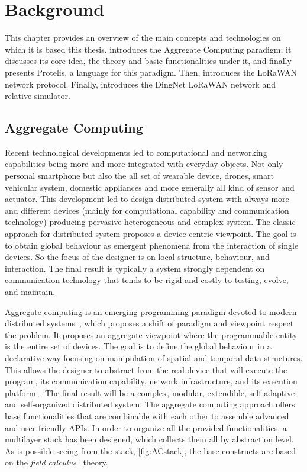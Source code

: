 \chapter{Background}
\label{chap:background}
This chapter provides an overview of the main concepts and technologies on which it is based this thesis.  introduces the Aggregate Computing paradigm; it discusses its core idea, the theory and basic functionalities under it, and finally presents Protelis, a language for this paradigm. 
Then,  introduces the LoRaWAN network protocol. 
Finally,  introduces the DingNet LoRaWAN network and relative simulator. 

\section{Aggregate Computing}
\label{sec:AC}
Recent technological developments led to computational and networking capabilities being more and more integrated with everyday objects. 
% 
Not only personal smartphone but also the all set of wearable device, drones, smart vehicular system, domestic appliances and more generally all kind of sensor and actuator.
% 
This development led to design distributed system with always more and different devices (mainly for computational capability and communication technology) producing pervasive heterogeneous and complex system.
% 
The classic approach for distributed system proposes a device-centric viewpoint.
% 
The goal is to obtain global behaviour as emergent phenomena from the interaction of single devices. 
% 
So the focus of the designer is on local structure, behaviour, and interaction. 
% 
The final result is typically a system strongly dependent on communication technology that tends to be rigid and costly to testing, evolve, and maintain.
 
Aggregate computing is an emerging programming paradigm devoted to modern distributed systems~\cite{BealIEEEComputer2015}, which proposes a shift of paradigm and viewpoint respect the problem. 
% 
It proposes an aggregate viewpoint where the programmable entity is the entire set of devices.
% 
The goal is to define the global behaviour in a declarative way focusing on manipulation of spatial and temporal data structures. This allows the designer to abstract from the real device that will execute the program, its communication capability, network infrastructure, and its execution platform~\cite{ViroliUbiComp2016}. 
% 
The final result will be a complex, modular, extendible, self-adaptive and self-organized distributed system.
% 
The aggregate computing approach offers base functionalities that are combinable with each other to assemble advanced and user-friendly APIs. In order to organize all the provided functionalities, a multilayer stack has been designed, which collects them all by abstraction level. 
As is possible seeing from the stack, \autoref{fig:ACstack}, the base constructs are based on the \textit{field calculus}~\cite{Audrito2019} theory.

